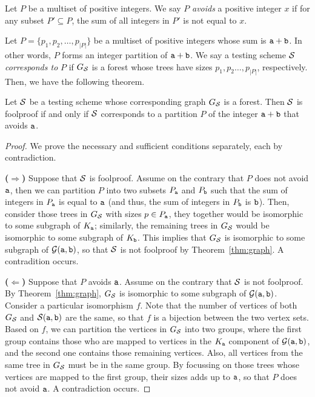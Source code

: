 \begin{definition}
Let $P$ be a multiset of positive integers.  
We say $P$ \emph{avoids} a positive integer $x$ if for any subset $P' \subseteq P$,
the sum of all integers in $P'$ is not equal to $x$.
\end{definition}

Let $P = \{ p_1, p_2, \ldots, p_{|P|} \}$ be a multiset of positive integers whose sum is $\mathtt{a} + \mathtt{b}$.  
In other words, $P$ forms an integer partition of $\mathtt{a} + \mathtt{b}$.   
We say a testing scheme ${\cal S}$ \emph{corresponds to} $P$ if $G_{\cal S}$ is a forest whose trees have 
sizes $p_1, p_2 \ldots, p_{|P|}$, respectively.  Then, we have the following theorem.
 
\begin{theorem} \label{thm:partition}
Let ${\cal S}$ be a testing scheme whose corresponding graph $G_{\cal S}$ is a forest.
Then ${\cal S}$ is foolproof if and only if ${\cal S}$ corresponds to a partition $P$ of the integer $\mathtt{a}+\mathtt{b}$
that avoids $\mathtt{a}$.
\end{theorem}
\begin{proof}
We prove the necessary and sufficient conditions separately, each by contradiction.

\medskip

\noindent
{\bf ($\Rightarrow$)}
Suppose that ${\cal S}$ is foolproof.  Assume on the contrary that $P$ does not avoid $\mathtt{a}$, then we can partition $P$ into two subsets $P_{\mathtt{a}}$ and $P_{\mathtt{b}}$ such that the sum of integers in $P_{\mathtt{a}}$ is equal to $\mathtt{a}$ (and thus, the sum of integers in $P_{\mathtt{b}}$ is $\mathtt{b}$).   
Then, consider those trees in $G_{\cal S}$ with sizes $p \in P_{\mathtt{a}}$, they together would be isomorphic to some subgraph of $K_{\mathtt{a}}$;  similarly, the remaining trees in $G_{\cal S}$ would be isomorphic to some subgraph of $K_{\mathtt{b}}$.  
This implies that $G_{\cal S}$ is isomorphic to some subgraph of ${\cal G}(\mathtt{a},\mathtt{b})$, so that ${\cal S}$ is not foolproof by Theorem~\ref{thm:graph}.  A contradition occurs.

\medskip

\noindent
{\bf ($\Leftarrow$)} Suppose that $P$ avoids $\mathtt{a}$.  Assume on the contrary that ${\cal S}$ is not foolproof.  
By Theorem~\ref{thm:graph}, $G_{\cal S}$ is isomorphic to some subgraph of ${\cal G}(\mathtt{a},\mathtt{b})$.   
Consider a particular isomorphism $f$.  Note that the number of vertices of both $G_{\cal S}$ and ${\cal S}(\mathtt{a},\mathtt{b})$ are the same, so that $f$ is a bijection between the two vertex sets.  Based on $f$, we can partition the vertices in $G_{\cal S}$ into two groups, where the first group contains those who are mapped to vertices in the $K_{\mathtt{a}}$ component of ${\cal G}(\mathtt{a},\mathtt{b})$, and the second one contains those remaining vertices.  Also, all vertices from the same tree in $G_{\cal S}$ must be in the same group.  By focussing on those trees whose vertices are mapped to the first group, their sizes adds up to $\mathtt{a}$, so that 
$P$ does not avoid $\mathtt{a}$.  A contradiction occurs.
\end{proof}

